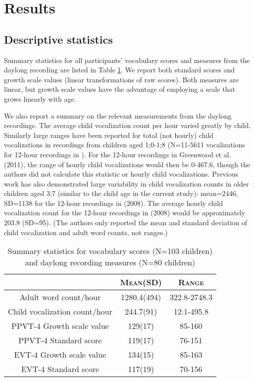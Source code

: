 \documentclass[a4paper,man,natbib,donotrepeattitle, apacite]{apa6}
\begin{document}
\section{Results}

\subsection{Descriptive statistics}

Summary statistics for all participants’ vocabulary scores and measures from the daylong recording are listed in Table \ref{tab:sum-stat}. We report both standard scores and growth scale values (linear transformations of raw scores). Both measures are linear, but growth scale values have the advantage of employing a scale that grows linearly with age. 

We also report a summary on the relevant measurements from the daylong recordings. The average child vocalization count per hour varied greatly by child. Similarly large ranges have been reported for total (not hourly) child vocalizations in recordings from children aged 1;0-1;8 (N=11-5611 vocalizations for 12-hour recordings in ). For the 12-hour recordings in Greenwood et al. (2011), the range of hourly child vocalizations would then be 0-467.6, though the authors did not calculate this statistic or hourly child vocalizations. Previous work has also demonstrated large variability in child vocalization counts in older children aged 3;7 (similar to the child age in the current study): mean=2446, SD=1138 for the 12-hour recordings in \citeauthor{gilkersonLENANaturalLanguage2008} (2008). The average hourly child vocalization count for the 12-hour recordings in \citeauthor{gilkersonLENANaturalLanguage2008} (2008) would be approximately 203.8 (SD=95). (The authors only reported the mean and standard deviation of child vocalization and adult word counts, not ranges.) 

\begin{table}
\centering
\caption{\label{tab:sum-stat}Summary statistics for vocabulary scores (N=103 children) and 
daylong recording measures (N=80 children)}

\begin{tabular}{c | c | c } 
\hline
 & \textsc{Mean(SD)} & \textsc{Range} \\
\hline
\midrule

Adult word count/hour & 1280.4(494) & 322.8-2748.3 \\
Child vocalization count/hour & 244.7(91) & 12.1-495.8 \\
PPVT-4 Growth scale value & 129(17) & 85-160 \\
PPVT-4 Standard score & 119(17) & 76-151 \\
EVT-4 Growth scale value & 134(15) & 85-163 \\
EVT-4 Standard score & 117(19) & 70-156 \\


\bottomrule
\end{tabular}
\end{table}
\end{document}
